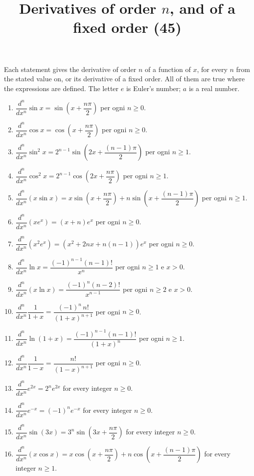 \documentclass[11pt,a4paper]{article}
\title{Derivatives of order $n$, and of a fixed order (45)}
\author{}
\date{}
\begin{document}
\maketitle
Each statement gives the derivative of order $n$ of a function of $x$, for every $n$ from the stated value on, or its derivative of a fixed order. All of them are true where the expressions are defined. The letter $e$ is Euler's number; $a$ is a real number.

\begin{enumerate}
\item $\dfrac{d^n}{dx^n}\sin x=\sin\left(x+\dfrac{n\pi}{2}\right)$ per ogni $n\ge0$.
\item $\dfrac{d^n}{dx^n}\cos x=\cos\left(x+\dfrac{n\pi}{2}\right)$ per ogni $n\ge0$.
\item $\dfrac{d^n}{dx^n}\sin^2x=2^{n-1}\sin\left(2x+\dfrac{(n-1)\pi}{2}\right)$ per ogni $n\ge1$.
\item $\dfrac{d^n}{dx^n}\cos^2x=2^{n-1}\cos\left(2x+\dfrac{n\pi}{2}\right)$ per ogni $n\ge1$.
\item $\dfrac{d^n}{dx^n}\left(x\sin x\right)=x\sin\left(x+\dfrac{n\pi}{2}\right)+n\sin\left(x+\dfrac{(n-1)\pi}{2}\right)$ per ogni $n\ge1$.
\item $\dfrac{d^n}{dx^n}\left(xe^{x}\right)=(x+n)e^{x}$ per ogni $n\ge0$.
\item $\dfrac{d^n}{dx^n}\left(x^2e^{x}\right)=\left(x^2+2nx+n(n-1)\right)e^{x}$ per ogni $n\ge0$.
\item $\dfrac{d^n}{dx^n}\ln x=\dfrac{(-1)^{n-1}(n-1)!}{x^n}$ per ogni $n\ge1$ e $x>0$.
\item $\dfrac{d^n}{dx^n}\left(x\ln x\right)=\dfrac{(-1)^n(n-2)!}{x^{n-1}}$ per ogni $n\ge2$ e $x>0$.
\item $\dfrac{d^n}{dx^n}\dfrac{1}{1+x}=\dfrac{(-1)^n\,n!}{(1+x)^{n+1}}$ per ogni $n\ge0$.
\item $\dfrac{d^n}{dx^n}\ln(1+x)=\dfrac{(-1)^{n-1}(n-1)!}{(1+x)^n}$ per ogni $n\ge1$.
\item $\dfrac{d^n}{dx^n}\dfrac{1}{1-x}=\dfrac{n!}{(1-x)^{n+1}}$ per ogni $n\ge0$.
\item $\dfrac{d^n}{dx^n}e^{2x}=2^{n}e^{2x}$ for every integer $n\ge0$.
\item $\dfrac{d^n}{dx^n}e^{-x}=(-1)^{n}e^{-x}$ for every integer $n\ge0$.
\item $\dfrac{d^n}{dx^n}\sin(3x)=3^{n}\sin\left(3x+\dfrac{n\pi}{2}\right)$ for every integer $n\ge0$.
\item $\dfrac{d^n}{dx^n}\left(x\cos x\right)=x\cos\left(x+\dfrac{n\pi}{2}\right)+n\cos\left(x+\dfrac{(n-1)\pi}{2}\right)$ for every integer $n\ge1$.

\end{enumerate}
\end{document}
